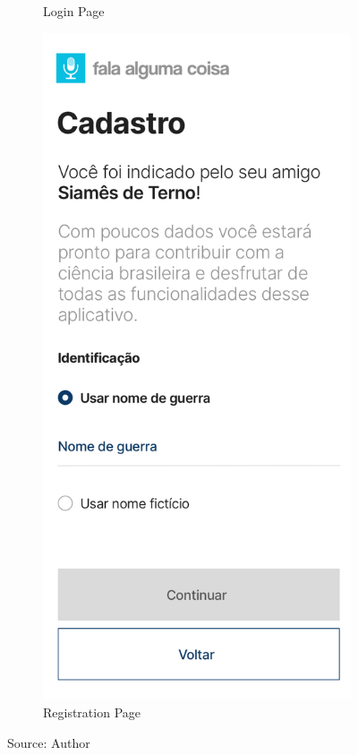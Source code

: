 \begin{figure}[ht]
\begin{subfigure}{.5\textwidth}
      \caption{Login Page}
      \label{fig:falealgumacoisa-login-page-design}
    \end{subfigure}%
    \begin{subfigure}{.5\textwidth}
      \centering
      \includegraphics[width=.9\linewidth]{images/app/register/Register1.0.png}
      \caption{Registration Page}
      \label{fig:falealgumacoisa-registration-page-design}
    \end{subfigure}
    \caption*{Source: Author}
    \label{fig:falealgumacoisa-login-page-design}
\end{figure}

